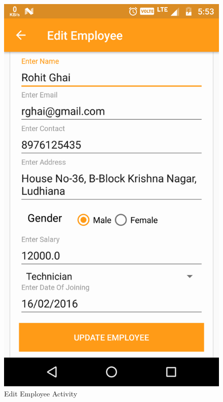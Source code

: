 \\
\begin{figure}[h]
	\centering
	\includegraphics[width=0.7\linewidth]{EditEmployeeActivity}
	\caption{Edit Employee Activity}
\end{figure}
\pagebreak

